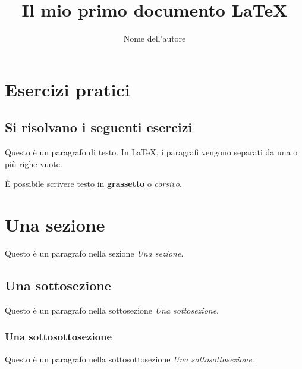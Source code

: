 \documentclass{article}
\begin{document}
\section{Esercizi pratici}
\subsection{Si risolvano i seguenti esercizi}


\title{Il mio primo documento LaTeX}
\author{Nome dell'autore}
\date{}




Questo è un paragrafo di testo. In LaTeX, i paragrafi vengono separati da una o più righe vuote.

È possibile scrivere testo in \textbf{grassetto} o \emph{corsivo}.

\section{Una sezione}

Questo è un paragrafo nella sezione \emph{Una sezione}.

\subsection{Una sottosezione}

Questo è un paragrafo nella sottosezione \emph{Una sottosezione}.

\subsubsection{Una sottosottosezione}

Questo è un paragrafo nella sottosottosezione \emph{Una sottosottosezione}.
\end{document}
